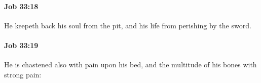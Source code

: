 		\paragraph{Job 33:18} %
			\label{JOB-33-18}

			He keepeth back his soul from the pit, and his life from perishing by the sword.


		\paragraph{Job 33:19} %
			\label{JOB-33-19}

			He is chastened also with pain upon his bed, and the multitude of his bones with strong pain:


